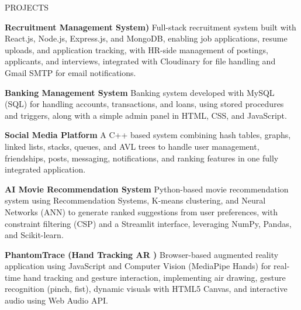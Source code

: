\documentclass{resume} %
\begin{document}
\begin{rSection}{PROJECTS}
\vspace{-1.25em}
\item \textbf{Recruitment Management System)}
Full-stack recruitment system built with React.js, Node.js, Express.js, and MongoDB, enabling job applications, resume uploads, and application tracking, with HR-side management of postings, applicants, and interviews, integrated with Cloudinary for file handling and Gmail SMTP for email notifications.

\item \textbf{Banking Management System}
Banking system developed with MySQL (SQL) for handling accounts, transactions, and loans, using stored procedures and triggers, along with a simple admin panel in HTML, CSS, and JavaScript.

\item \textbf{Social Media Platform}
A C++ based system combining hash tables, graphs, linked lists, stacks, queues, and AVL trees to handle user management, friendships, posts, messaging, notifications, and ranking features in one fully integrated application.


\item \textbf{AI Movie Recommendation System}
Python-based movie recommendation system using Recommendation Systems, K-means clustering, and Neural Networks (ANN) to generate ranked suggestions from user preferences, with constraint filtering (CSP) and a Streamlit interface, leveraging NumPy, Pandas, and Scikit-learn.


\item \textbf{PhantomTrace (Hand Tracking AR )}
Browser-based augmented reality application using JavaScript and Computer Vision (MediaPipe Hands) for real-time hand tracking and gesture interaction, implementing air drawing, gesture recognition (pinch, fist), dynamic visuals with HTML5 Canvas, and interactive audio using Web Audio API.

\end{rSection}



\end{document}
